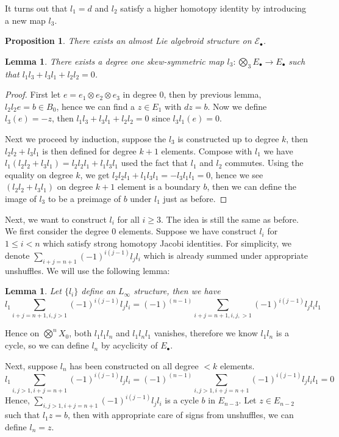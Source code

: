 \documentclass[12pt]{amsart}
\newtheorem{lem}[thm]{Lemma}
\newtheorem{prop}[thm]{Proposition}
\theoremstyle{definition}
\theoremstyle{remark}
\numberwithin{equation}{section}
\newcommand{\1}{{\mathbb{1}}}
\newcommand{\E}{{\mathcal{E}}}
\begin{document}
    It turns out that $l_1 = d$ and  $l_2$ satisfy a higher homotopy identity by introducing a new map $l_3$.
    
    \begin{prop}
    	There exists an almost Lie algebroid structure on $\E_{\bullet}$.
    \end{prop}

    \begin{lem}
    There exists a degree one skew-symmetric map $l_3: \bigotimes_3 E_{\bullet} \to E_{\bullet} $ such that $l_1l_3 + l_3l_1 + l_2l_2 = 0$.
    \end{lem}
    \begin{proof}First let $e= e_1\otimes e_2\otimes e_3$ in degree 0, then by previous lemma, $l_2l_2e = b \in B_0$, hence we can find a $z\in E_1$ with $dz = b$. Now we define $l_3(e) = -z$, then $l_1l_3 + l_3l_1 + l_2l_2=0$ since $l_3l_1(e)=0$.
    	
    Next we proceed by induction, suppose the $l_3$ is constructed up to degree $k$, then $l_2l_2 + l_3l_1$ is then defined for degree $k+1$ elements. Compose with $l_1$ we have $l_1(l_2l_2 + l_3 l_1)=l_2l_2 l_1 + l_1 l_3 l_1$ used the fact that $l_1$ and $l_2$ commutes. Using the equality on degree $k$, we get $l_2l_2 l_1 + l_1 l_3 l_1 = -l_3 l_1 l_1 = 0$, hence we see $(l_2l_2 + l_3 l_1)$ on degree $k + 1$ element is a boundary $b$, then we can define the image of  $l_3$  to be a preimage of $b$ under $l_1$ just as before.
    	\end{proof}

Next, we want to construct $l_i$ for all $i\ge 3$. The idea is still the same as before. We first consider the degree 0 elements. Suppose we have construct $l_i$ for $1 \le i <n$ which satisfy strong homotopy Jacobi identities. For simplicity, we denote $\sum_{i+j = n+1}^{} (-1)^{i(j-1)} l_jl_i$ which is already summed under appropriate unshuffles. We will use the following lemma:
\begin{lem}
	Let $\{l_i\}$ define an $L_{\infty}$ structure, then we have 
	$$l_1 \sum_{i+j = n+1, i,j >1}^{} (-1)^{i(j-1)} l_jl_i = (-1)^{(n-1) }\sum_{i+j = n+1, i,j, >1}^{} (-1)^{i(j-1)} l_jl_il_1$$
\end{lem}
Hence on $\bigotimes^n X_0$, both $l_1 l_1 l_n$ and $l_1 l_n l_1$ vanishes, therefore we know $l_1l_n$ is a cycle, so we can define $l_n$ by acyclicity of $E_{\bullet}$.

Next, suppose $l_n$ has been constructed on all degree $<k$ elements.  $$
l_1 \sum_{i, j > 1, i+j = n+1}^{} (-1)^{i(j-1)} l_jl_i = (-1)^{(n-1)}\sum_{i, j >1, i+j = n+1}^{} (-1)^{i(j-1)} l_jl_il_1=0
$$
Hence, $\sum_{i, j > 1, i+j = n+1}^{} (-1)^{i(j-1)} l_jl_i$ is a cycle $b$ in $E_{n-3}$. Let $z\in E_{n-2}$ such that $l_1z = b$, then with appropriate care of signs from unshuffles, we can define $l_n = z$.
\end{document}
